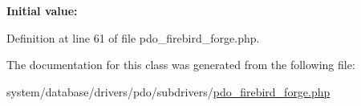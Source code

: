 {\bfseries Initial value\+:}
\begin{DoxyCode}{0}
\DoxyCodeLine{        \textcolor{stringliteral}{'SMALLINT'}  => \textcolor{stringliteral}{'INTEGER'},}
\DoxyCodeLine{        \textcolor{stringliteral}{'INTEGER'}   => \textcolor{stringliteral}{'INT64'},}
\DoxyCodeLine{        \textcolor{stringliteral}{'FLOAT'}     => \textcolor{stringliteral}{'DOUBLE PRECISION'}}
\DoxyCodeLine{    )}

\end{DoxyCode}


Definition at line 61 of file pdo\+\_\+firebird\+\_\+forge.\+php.



The documentation for this class was generated from the following file\+:\begin{DoxyCompactItemize}
\item 
system/database/drivers/pdo/subdrivers/\mbox{\hyperlink{pdo__firebird__forge_8php}{pdo\+\_\+firebird\+\_\+forge.\+php}}\end{DoxyCompactItemize}
